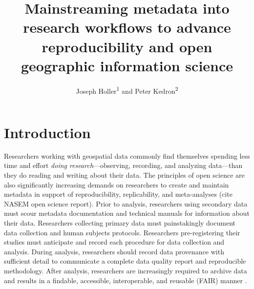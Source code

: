 \documentclass{isprs} %
\begin{document}
\title{Mainstreaming metadata into research workflows to advance reproducibility and open geographic information science}
\date{}


\author{Joseph Holler\textsuperscript{1} and Peter Kedron\textsuperscript{2}}

\address{\textsuperscript{1}Department of Geography, Middlebury College - josephh@middlebury.edu \\
\textsuperscript{2}School of Geographical Sciences and Urban Planning, Arizona State University - peter.kedron@asu.edu}




\commission{}{} %
\workinggroup{} %
\icwg{}   %



\maketitle


\sloppy

\section{Introduction}\label{Introduction}

Researchers working with geospatial data commonly find themselves spending less time and effort \textit{doing research}---observing, recording, and analyzing data---than they do reading and writing about their data.
The principles of open science are also significantly increasing demands on researchers to create and maintain metadata in support of reproducibility, replicability, and meta-analyses (cite NASEM open science report). Prior to analysis, researchers using secondary data must scour metadata documentation and technical manuals for information about their data.
Researchers collecting primary data must painstakingly document data collection and human subjects protocols.
Researchers pre-registering their studies must anticipate and record each procedure for data collection and analysis. During analysis, researchers should record data provenance with sufficient detail to communicate a complete data quality report and reproducible methodology.
After analysis, researchers are increasingly required to archive data and results in a findable, accessible, interoperable, and reusable (FAIR) manner \citep{Wilkinson2016}.
\end{document}
